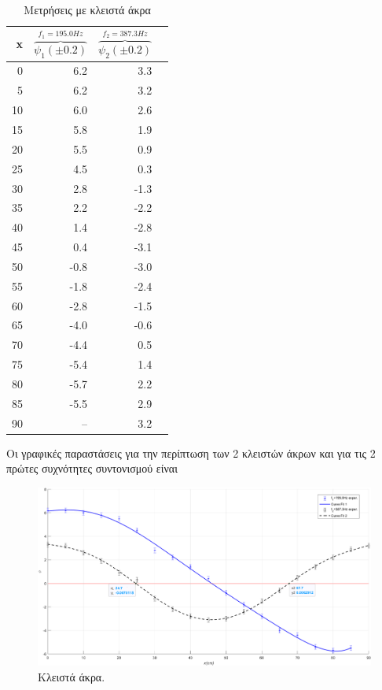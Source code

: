 \documentclass[a4paper]{article}
\begin{document}
\begin{table}[h!]
\centering
\caption{Μετρήσεις με κλειστά άκρα}
\begin{tabular}{r|r|r|r}
x & $\overbrace{\psi_1 (\pm0.2)}^{f_1=195.0Hz} $ &   $\overbrace{\psi_2 (\pm0.2)}^{f_2=387.3Hz}$    \\
\hline\hline
 0 &6.2&3.3\\
 5&6.2&3.2\\
10&6.0&2.6\\
15&5.8&1.9\\
20&5.5&0.9\\
25&4.5&0.3\\
30&2.8&-1.3\\
35&2.2&-2.2\\
40&1.4&-2.8\\
45&0.4&-3.1\\
50&-0.8&-3.0\\
55&-1.8&-2.4\\
60&-2.8&-1.5\\
65&-4.0&-0.6\\
70&-4.4&0.5\\
75&-5.4&1.4\\
80&-5.7&2.2\\
85&-5.5&2.9\\
90&-- &  3.2\\
\end{tabular}
\end{table}

 
Οι γραφικές παραστάσεις για την περίπτωση των 2 κλειστών άκρων και για τις 2 πρώτες συχνότητες συντονισμού είναι\footnotemark
{}
\begin{figure}[h!]
\centering 
\caption{Κλειστά άκρα. }
\includegraphics[scale=0.5]{plotclosed.png}
\end{figure}
 
\end{document}
